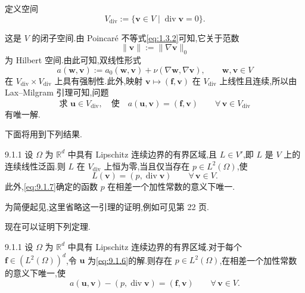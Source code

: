 \begin{definition*}
定义空间
\begin{equation}\label{eq:9.1.3}
  V_{\mathrm{div}}:=\{\boldsymbol{v}\in V\mid\operatorname{div}\boldsymbol{v}=0\}.
\end{equation}
\end{definition*}
这是 \(V\) 的闭子空间.由 Poincaré 不等式\eqref{eq:1.3.2}可知,它关于范数
\begin{equation}\label{eq:9.1.4}
  \|\boldsymbol{v}\|:=\|\nabla\boldsymbol{v}\|_0
\end{equation}
为 Hilbert 空间.由此可知,双线性形式
\begin{equation}\label{eq:9.1.5}
  a(\boldsymbol{w},\boldsymbol{v}):=a_0(\boldsymbol{w},\boldsymbol{v})
      +\nu(\nabla\boldsymbol{w},\nabla\boldsymbol{v}),\qquad \boldsymbol{w},\boldsymbol{v}\in V
\end{equation}
在 \(V_{\mathrm{div}}\times V_{\mathrm{div}}\) 上具有强制性.此外,映射 \(\boldsymbol{v}\mapsto(\boldsymbol{f},\boldsymbol{v})\) 在 \(V_{\mathrm{div}}\) 上线性且连续,所以由 Lax--Milgram 引理可知,问题
\begin{equation}\label{eq:9.1.6}
  \text{求 }\boldsymbol{u}\in V_{\mathrm{div}},\quad\text{使}\quad
     a(\boldsymbol{u},\boldsymbol{v})=(\boldsymbol{f},\boldsymbol{v})
      \qquad\forall\,\boldsymbol{v}\in V_{\mathrm{div}}
\end{equation}
有唯一解.

下面将用到下列结果.

\begin{lemma}[]{9.1.1}
设 \(\Omega\) 为 \(\mathbb R^d\) 中具有 Lipschitz 连续边界的有界区域,且 \(L\in V'\),即 \(L\) 是 \(V\) 上的连续线性泛函.则 \(L\) 在 \(V_{\mathrm{div}}\) 上恒为零,当且仅当存在 \(p\in L^2(\Omega)\),使
\begin{equation}\label{eq:9.1.7}
  L(\boldsymbol{v})=(p,\operatorname{div}\boldsymbol{v})\qquad\forall\,\boldsymbol{v}\in V.
\end{equation}
此外,\eqref{eq:9.1.7}确定的函数 \(p\) 在相差一个加性常数的意义下唯一.
\end{lemma}

为简便起见,这里省略这一引理的证明,例如可见第 22 页.

现在可以证明下列定理.

\begin{theorem}[]{9.1.1}
设 \(\Omega\) 为 \(\mathbb R^d\) 中具有 Lipschitz 连续边界的有界区域.对于每个 \(\boldsymbol{f}\in(L^2(\Omega))^d\),令 \(\boldsymbol{u}\) 为\eqref{eq:9.1.6}的解.则存在 \(p\in L^2(\Omega)\),在相差一个加性常数的意义下唯一,使
\begin{equation}\label{eq:9.1.8}
  a(\boldsymbol{u},\boldsymbol{v})-(p,\operatorname{div}\boldsymbol{v})=(\boldsymbol{f},\boldsymbol{v})
      \qquad\forall\,\boldsymbol{v}\in V.
\end{equation}
\end{theorem}

